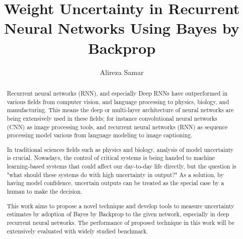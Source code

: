 \documentclass{utmthesis}
\begin{document}
\title{Weight Uncertainty in Recurrent Neural Networks Using Bayes by Backprop}
\author{Alireza Samar}



\frontmatter
\maketitle



\begin{abstract}
Recurrent neural networks (RNN), and especially Deep RNNs have outperformed in various fields from computer vision, and language processing to physics, biology, and manufacturing. This means the deep or multi-layer architecture of neural networks are being extensively used in these fields; for instance convolutional neural networks (CNN) as image processing tools, and recurrent neural networks (RNN) as sequence processing model various from language modeling to image captioning.

In traditional sciences fields such as physics and biology, analysis of model uncertainty is crucial. Nowadays, the control of critical systems is being handed to machine learning-based systems that could affect our day-to-day life directly, but the question is "what should these systems do with high uncertainty in output?" As a solution, by having model confidence, uncertain outputs can be treated as the special case by a human to make the decision.

This work aims to propose a novel technique and develop tools to measure uncertainty estimates by adoption of Bayes by Backprop to the given network, especially in deep recurrent neural networks. The performance of proposed technique in this work will be extensively evaluated with widely studied benchmark.

\end{abstract}
\end{document}
